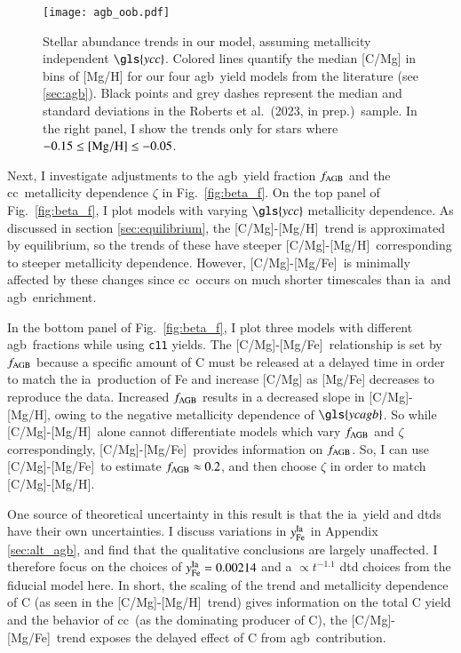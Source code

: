 \documentclass[12pt,oneside,letterpaper]{report}
\newcommand{\cc}{\gls{cc}}
\newcommand{\agb}{\gls{agb}}
\newcommand{\ia}{\gls{ia}}
\newcommand{\cxi}{\texttt{\gls{c11}}}
\newcommand{\Ycc}{\gls{ycc}}
\newcommand{\Ycagb}{\gls{ycagb}}
\newcommand{\caah}{[C/Mg]-[Mg/H]}
\newcommand{\caafe}{[C/Mg]-[Mg/Fe]}
\newcommand{\citetjack}{Roberts et al.~(2023, in prep.)}
\begin{document}
\begin{figure}[htp]
\centering
\texttt{[image: agb\_oob.pdf]}
\caption[Mean stellar abundance trends]{
    Stellar abundance trends in our model, assuming metallicity independent $\Ycc$. Colored lines quantify the median [C/Mg] in bins of [Mg/H] for our four \agb\ yield models from the literature (see \ref{sec:agb}). Black points and grey dashes represent the median and standard deviations in the \citetjack~sample. In the right panel, I show the trends only for stars where $-0.15\leq {\rm [Mg/H]}\leq -0.05$.
}
\label{fig:agb_sims}
\end{figure}


Next, I investigate adjustments to the \agb\ yield fraction $f_{\rm AGB}$ and the \cc\ metallicity dependence $\zeta$ in Fig.~\ref{fig:beta_f}. On the top panel of Fig.~\ref{fig:beta_f}, I plot models with varying $\Ycc$ metallicity dependence. As discussed in section \ref{sec:equilibrium}, the \caah~trend is approximated by equilibrium, so the trends of these have steeper \caah~corresponding to steeper metallicity dependence. However, \caafe~is minimally affected by these changes since \cc\ occurs on much shorter timescales than \ia\ and \agb\ enrichment.

In the bottom panel of Fig.~\ref{fig:beta_f}, I plot three models with different \agb\ fractions while using \cxi{} yields.  The \caafe~relationship is set by $f_{\rm AGB}$ because a specific amount of C must be released at a delayed time in order to match the \ia\ production of Fe and increase [C/Mg] as [Mg/Fe] decreases to reproduce the data.
Increased $f_{\rm AGB}$ results in a decreased slope in \caah, owing to the negative metallicity dependence of $\Ycagb$. So while \caah~alone cannot differentiate models which vary $f_{\rm AGB}$ and $\zeta$ correspondingly, \caafe~provides information on $f_{\rm AGB}$. So, I can use \caafe~to estimate $f_{\rm AGB}\approx 0.2$, and then choose $\zeta$ in order to match \caah.

One source of theoretical uncertainty in this result is that the \ia\ yield and \gls{dtd}s have their own uncertainties. I discuss variations in $y_{\rm Fe}^{\rm Ia}$ in Appendix \ref{sec:alt_agb}, and find that the qualitative conclusions are largely unaffected. I therefore focus on the choices of $y_{\rm Fe}^{\rm Ia} = 0.00214$ and a $\propto t^{-1.1}$ \gls{dtd} choices from the fiducial model here.
In short, the scaling of the trend and metallicity dependence of C (as seen in
the \caah\ trend) gives information on the total C yield and the behavior of \cc\ (as the dominating producer of C), the \caafe\ trend exposes the delayed effect of C from \agb\ contribution.
\end{document}
